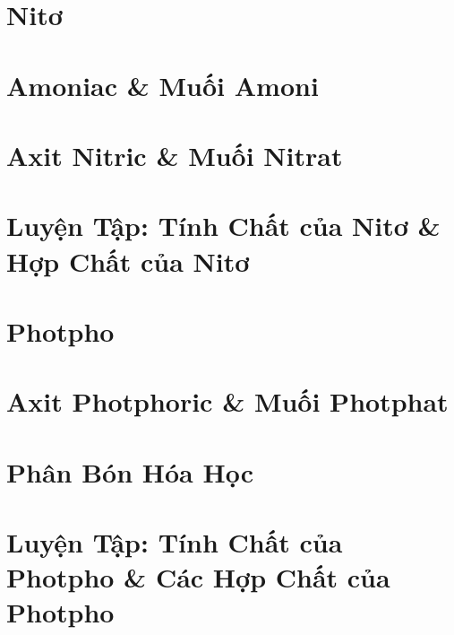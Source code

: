 \documentclass[oneside]{book}
\numberwithin{equation}{section}
\begin{document}
\section{Nitơ}


\section{Amoniac \& Muối Amoni}


\section{Axit Nitric \& Muối Nitrat}


\section{Luyện Tập: Tính Chất của Nitơ \& Hợp Chất của Nitơ}


\section{Photpho}


\section{Axit Photphoric \& Muối Photphat}


\section{Phân Bón Hóa Học}


\section{Luyện Tập: Tính Chất của Photpho \& Các Hợp Chất của Photpho}
\end{document}
